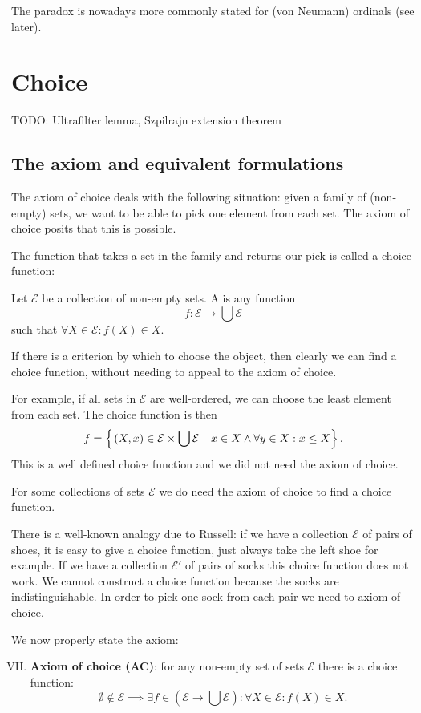 The paradox is nowadays more commonly stated for (von Neumann) ordinals (see later).




\chapter{Choice}
TODO: Ultrafilter lemma, Szpilrajn extension theorem

\section{The axiom and equivalent formulations}
The axiom of choice deals with the following situation: given a family of (non-empty) sets, we want to be able to pick one element from each set. The axiom of choice posits that this is possible.

The function that takes a set in the family and returns our pick is called a choice function:
\begin{definition}
Let $\mathcal{E}$ be a collection of non-empty sets. A  is any function
\[ f: \mathcal{E} \to \bigcup \mathcal{E} \]
such that $\forall X\in\mathcal{E}: f(X) \in X$.
\end{definition}

If there is a criterion by which to choose the object, then clearly we can find a choice function, without needing to appeal to the axiom of choice.

For example, if all sets in $\mathcal{E}$ are well-ordered, we can choose the least element from each set. The choice function is then
\[ f = \left\{\left.  (X,x)\in \mathcal{E}\times \bigcup \mathcal{E} \;\right|\; x\in X \land \forall y \in X: x\leq X  \right\}. \]
This is a well defined choice function and we did not need the axiom of choice.

For some collections of sets $\mathcal{E}$ we do need the axiom of choice to find a choice function.

There is a well-known analogy due to Russell: if we have a collection $\mathcal{E}$ of pairs of shoes, it is easy to give a choice function, just always take the left shoe for example. If we have a collection $\mathcal{E}'$ of pairs of socks this choice function does not work. We cannot construct a choice function because the socks are indistinguishable. In order to pick one sock from each pair we need to axiom of choice.

We now properly state the axiom:
\begin{enumerate}[(I)]
\setcounter{enumi}{6}
\item \textbf{Axiom of choice (AC)}: for any non-empty set of sets $\mathcal{E}$ there is a choice function:
\[ \emptyset \notin \mathcal{E} \implies \exists f \in \left(\mathcal{E} \to \bigcup \mathcal{E}\right): \forall X \in \mathcal{E}: f(X)\in X. \]
\end{enumerate}

